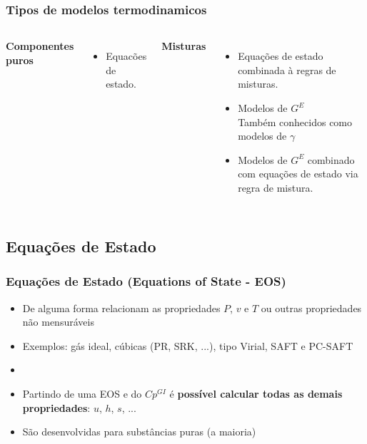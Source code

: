 \documentclass[aspectratio=169]{beamer}
\begin{document}
\begin{frame}
	\frametitle{Tipos de modelos termodinamicos}
	\begin{columns}[t] 
			\textbf{Componentes puros}\\
			\begin{itemize}
				\item Equacões de estado.
			\end{itemize}
			\textbf{Misturas}\\
			\begin{itemize}
				\item Equações de estado combinada à regras de misturas.
				\item Modelos de $G^E$ \\ 
				Também conhecidos como modelos de $\gamma$
				\item Modelos de $G^E$ combinado com equações de estado via regra de
				mistura.
			\end{itemize}
	\end{columns}
\end{frame}

\subsection*{Equações de Estado}

\begin{frame}
	\frametitle{Equações de Estado (Equations of State - EOS)}
	\begin{itemize}
		\item De alguma forma relacionam as propriedades $P$, $v$ e $T$ ou
		outras propriedades não mensuráveis
		\item Exemplos: gás ideal, cúbicas (PR, SRK, ...), tipo Virial, SAFT e
		PC-SAFT
		\pause
		\item[]
		\item Partindo de uma EOS e do $Cp^{GI}$ é \textbf{possível calcular todas
		as demais propriedades}: $u$, $h$, $s$, ...
		\item São desenvolvidas para substâncias puras (a maioria)
	\end{itemize}
\end{frame}
\end{document}

